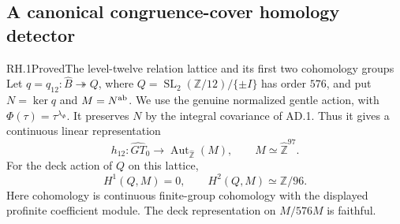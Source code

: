 \subsection{A canonical congruence-cover homology detector}

\begin{statement}{RH.1}{Proved}{The level-twelve relation lattice and its first two cohomology groups}
Let $q=q_{12}:\widehat B\twoheadrightarrow Q$, where
$Q=\operatorname{SL}_2(\mathbb Z/12)/\{\pm I\}$ has order $576$,
and put $N=\ker q$ and $M=N^{\rm ab}$.  We use the genuine
normalized gentle action, with $\Phi(\tau)=\tau^{\lambda_\Phi}$.
It preserves $N$ by the integral covariance of AD.1.  Thus it
gives a continuous linear representation
\[
 h_{12}:\widehat{GT}_0\longrightarrow
          \operatorname{Aut}_{\widehat{\mathbb Z}}(M),
 \qquad M\simeq\widehat{\mathbb Z}^{97}.
\]
For the deck action of $Q$ on this lattice,
\[
 H^1(Q,M)=0,\qquad H^2(Q,M)\simeq\mathbb Z/96.
\]
Here cohomology is continuous finite-group cohomology with the
displayed profinite coefficient module. The deck representation
on $M/576M$ is faithful.
\end{statement}
